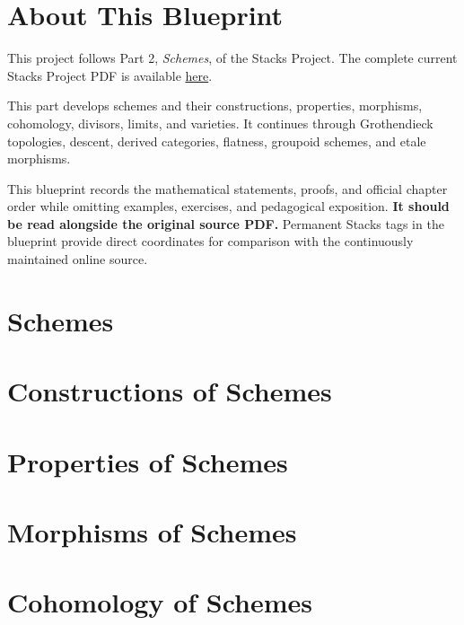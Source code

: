 

\chapter*{About This Blueprint}

This project follows Part 2, \emph{Schemes}, of the Stacks Project. The
complete current Stacks Project PDF is available
\href{https://stacks.math.columbia.edu/download/book.pdf}{here}.

This part develops schemes and their constructions, properties, morphisms,
cohomology, divisors, limits, and varieties. It continues through Grothendieck
topologies, descent, derived categories, flatness, groupoid schemes, and etale
morphisms.

This blueprint records the mathematical statements, proofs, and official
chapter order while omitting examples, exercises, and pedagogical exposition.
\textbf{It should be read alongside the original source PDF.} Permanent Stacks
tags in the blueprint provide direct coordinates for comparison with the
continuously maintained online source.

\chapter{Schemes}
\label{chap:schemes}


\chapter{Constructions of Schemes}
\label{chap:constructions}


\chapter{Properties of Schemes}
\label{chap:properties}


\chapter{Morphisms of Schemes}
\label{chap:morphisms}


\chapter{Cohomology of Schemes}
\label{chap:coherent}



